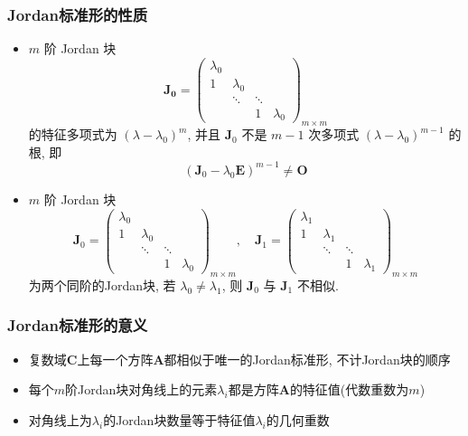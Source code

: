 \documentclass{article}
\begin{document}
			\subsubsection{Jordan标准形的性质}
				\begin{itemize}
					\item $m$ 阶 Jordan 块
					$$
					\boldsymbol{J_0}=\left(\begin{array}{cccc}
						\lambda_{0} & & & \\
						1 & \lambda_{0} & & \\
						& \ddots & \ddots & \\
						& & 1 & \lambda_{0}
					\end{array}\right)_{m \times m}
					$$
					的特征多项式为 $\left(\lambda-\lambda_{0}\right)^{m}$, 并且 $\boldsymbol{J}_{0}$ 不是 $m-1$ 次多项式 $\left(\lambda-\lambda_{0}\right)^{m-1}$ 的根, 即
					$$
					\left(\boldsymbol{J}_{0}-\lambda_{0} \boldsymbol{E}\right)^{m-1} \neq \boldsymbol{O}
					$$
					\item $m$ 阶 Jordan 块
					$$
					\boldsymbol{J}_{0}=\left(\begin{array}{cccc}
						\lambda_{0} & & & \\
						1 & \lambda_{0} & & \\
						& \ddots & \ddots & \\
						& & 1 & \lambda_{0}
					\end{array}\right)_{m \times m}, \quad \boldsymbol{J}_{1}=\left(\begin{array}{cccc}
						\lambda_{1} & & & \\
						1 & \lambda_{1} & & \\
						& \ddots & \ddots & \\
						& & 1 & \lambda_{1}
					\end{array}\right)_{m \times m}
					$$
					为两个同阶的Jordan块, 若 $\lambda_{0} \neq \lambda_{1}$, 则 $\boldsymbol J_{0}$ 与 $\boldsymbol J_{1}$ 不相似.
				\end{itemize}
			\subsubsection{Jordan标准形的意义}
				\begin{itemize}
					\item 复数域$\mathbf{C}$上每一个方阵$\boldsymbol{A}$都相似于唯一的Jordan标准形, 不计Jordan块的顺序
					\item 每个$m$阶Jordan块对角线上的元素$\lambda_{i}$都是方阵$\boldsymbol{A}$的特征值(代数重数为$m$)
					\item 对角线上为$\lambda_{i}$的Jordan块数量等于特征值$\lambda_{i}$的几何重数
				\end{itemize}
\end{document}
